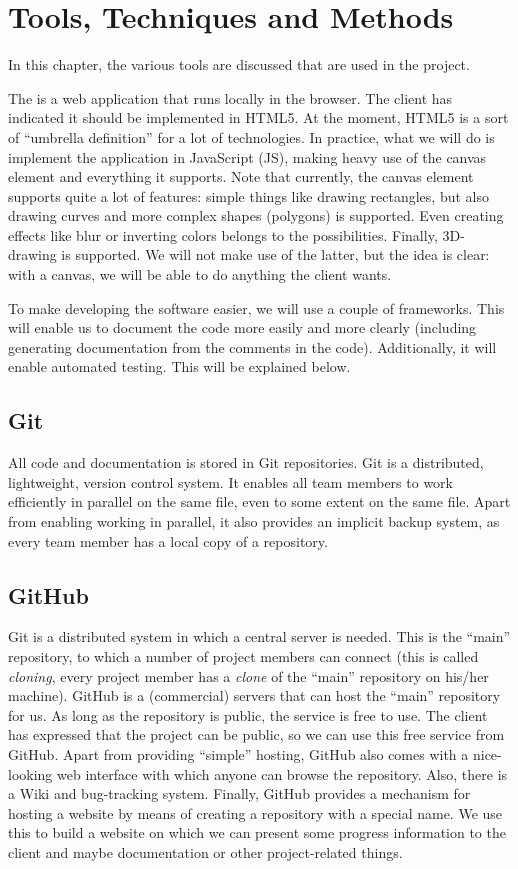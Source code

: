 \chapter{Tools, Techniques and Methods}
\label{chap:tools}
In this chapter, the various tools are discussed that are used in the \projectname{} project.

The \applicationname{} is a web application that runs locally in the browser. The client has indicated it should be implemented in HTML5. At the moment, HTML5 is a sort of ``umbrella definition'' for a lot of technologies. In practice, what we will do is implement the application in JavaScript (JS), making heavy use of the canvas element and everything it supports. Note that currently, the canvas element supports quite a lot of features: simple things like drawing rectangles, but also drawing curves and more complex shapes (polygons) is supported. Even creating effects like blur or inverting colors belongs to the possibilities. Finally, 3D-drawing is supported. We will not make use of the latter, but the idea is clear: with a canvas, we will be able to do anything the client wants.

To make developing the software easier, we will use a couple of frameworks. This will enable us to document the code more easily and more clearly (including generating documentation from the comments in the code). Additionally, it will enable automated testing. This will be explained below.

\section{Git}
All code and documentation is stored in Git repositories. Git is a distributed, lightweight, version control system. It enables all team members to work efficiently in parallel on the same file, even to some extent on the same file. Apart from enabling working in parallel, it also provides an implicit backup system, as every team member has a local copy of a repository.

\section{GitHub}
Git is a distributed system in which a central server is needed. This is the ``main'' repository, to which a number of project members can connect (this is called \emph{cloning}, every project member has a \emph{clone} of the ``main'' repository on his/her machine). GitHub is a (commercial) servers that can host the ``main'' repository for us. As long as the repository is public, the service is free to use. The client has expressed that the project can be public, so we can use this free service from GitHub. Apart from providing ``simple'' hosting, GitHub also comes with a nice-looking web interface with which anyone can browse the repository. Also, there is a Wiki and bug-tracking system. Finally, GitHub provides a mechanism for hosting a website by means of creating a repository with a special name. We use this to build a website on which we can present some progress information to the client and maybe documentation or other project-related things.

